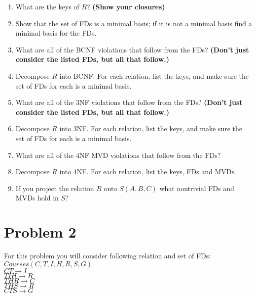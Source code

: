 \documentclass{article}
\begin{document}
\begin{enumerate}[label=\alph*.]
\item What are the keys of $R$? {\bf (Show your closures)} \\
{\bf  } \clearpage
\item Show that the set of FDs is a minimal basis; if it is not a minimal basis find a minimal basis for the FDs.\\
{\bf  } \clearpage
\item What are all of the BCNF violations that follow from the FDs? {\bf (Don't just consider the listed FDs, but all that follow.)} \\
{\bf  } \clearpage
\item Decompose $R$ into BCNF. For each relation, list the keys, and make sure the set of FDs for each is a minimal basis.\\
{\bf  } \clearpage
\item What are all of the 3NF violations that follow from the FDs? {\bf (Don't just consider the listed FDs, but all that follow.)} \\
{\bf  } \clearpage
\item Decompose $R$ into 3NF. For each relation, list the keys, and make sure the set of FDs for each is a minimal basis. \\
{\bf  } \clearpage
\item What are all of the 4NF MVD violations that follow from the FDs? \\
{\bf  } \clearpage
\item Decompose $R$ into 4NF. For each relation, list the keys, FDs and MVDs. \\
{\bf  } \clearpage
\item If you project the relation $R$ onto $S(A,B,C)$ what nontrivial FDs and MVDs hold in $S$? \\
{\bf  } \clearpage
\end{enumerate}

\section*{Problem 2} 
For this problem you will consider following relation and set of FDs:\\
$Courses(C,T,I,H,R,S,G)$\\
$CT\rightarrow I$\\
$TIH\rightarrow R$\\
$THR\rightarrow C$\\
$THS\rightarrow R$\\
$CTS\rightarrow G$\\
\end{document}
